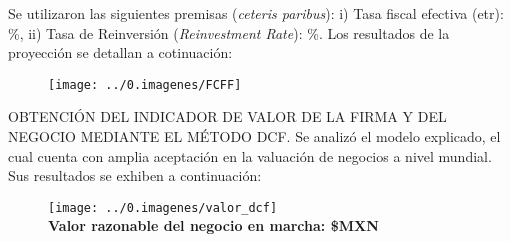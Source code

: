 Se utilizaron las siguientes premisas (\textit{ceteris paribus}): i) Tasa fiscal efectiva (\gls{etr}): \tasaFiscal\%, ii) Tasa de Reinversi\'on (\textit{Reinvestment Rate}): \reinvestmentRate\%. Los resultados de la proyecci\'on se detallan a cotinuaci\'on:

\begin{figure}[H]
\centering
\texttt{[image: ../0.imagenes/FCFF]}
\end{figure}



\textcolor{principal}{OBTENCI\'ON DEL INDICADOR DE VALOR DE LA FIRMA Y DEL NEGOCIO MEDIANTE EL M\'ETODO DCF.} Se analiz\'o el modelo explicado, el cual cuenta con amplia aceptaci\'on en la valuaci\'on de negocios a nivel mundial.  Sus resultados se exhiben a continuaci\'on:

\begin{figure}[H]
\centering
\texttt{[image: ../0.imagenes/valor\_dcf]}\\
\textcolor{principal}{\textbf{\textbullet Valor razonable del negocio en marcha: \$\valorDCF{}MXN}}
\end{figure}
